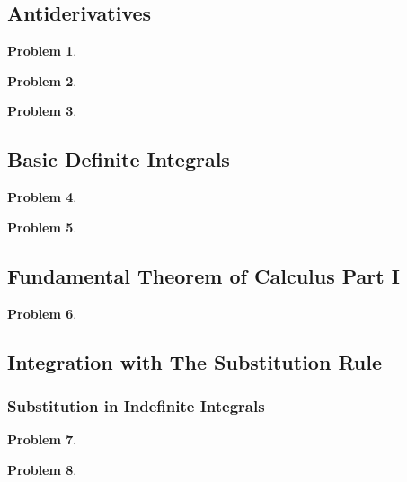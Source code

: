 \documentclass{article}
\newtheorem{problem}{Problem}
\begin{document}
\subsection{Antiderivatives}\label{secMPSantiderivatives}
\begin{problem}

\end{problem}
\begin{problem}

\end{problem}
\begin{problem}

\end{problem}

\subsection{Basic Definite Integrals} \label{secMPSBasicDefiniteIntegrals}
\begin{problem}

\end{problem}

\begin{problem}

\end{problem}
\subsection{Fundamental Theorem of Calculus Part I}\label{secMPSFTCpart1}
\begin{problem}

\end{problem}



\subsection{Integration with The Substitution Rule}
\label{secMPSintegrationSubstitutionRule}
\subsubsection{Substitution in Indefinite Integrals}
\label{secMPSintegrationSubstitutionRuleIndefinite}
\begin{problem}

\end{problem}

\begin{problem}

\end{problem}

\end{document}
